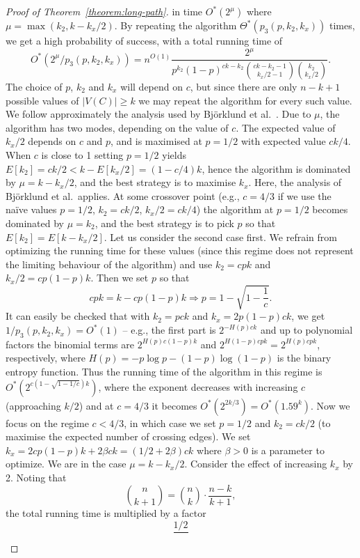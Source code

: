 \documentclass[10pt,a4paper]{article}
\begin{document}
\begin{proof}[Proof of Theorem~\ref{theorem:long-path}]
  in time $O^*(2^{\mu})$ where $\mu=\max(k_2,k-k_x/2)$.
  By repeating the algorithm $\Theta^*(p_3(p,k_2,k_x))$ times,
  we get a high probability of success, with a total running time of
  \[
    O^*(2^\mu/p_3(p, k_2, k_x)) = n^{O(1)}
    \frac{2^\mu}{p^{k_2}(1-p)^{ck-k_2}  \binom{ck-k_2-1}{k_x/2-1} \binom{k_2}{k_x/2}}.
  \]
  The choice of $p$, $k_2$ and $k_x$ will depend on $c$, but since
  there are only $n-k+1$ possible values of $|V(C)| \geq k$ we may
  repeat the algorithm for every such value. We follow approximately
  the analysis used by Bj\"orklund et al.~\cite{BjorklundHKK17narrow}.
  Due to $\mu$, the algorithm has two modes, depending on the value of $c$.
  The expected value of $k_x/2$ depends on $c$ and $p$, and is maximised
  at $p=1/2$ with expected value $ck/4$. When $c$ is close to 1 setting $p=1/2$
  yields $E[k_2]=ck/2 < k-E[k_x/2]=(1-c/4)k$, hence the algorithm is
  dominated by $\mu=k-k_x/2$, and the best strategy is to maximise $k_x$.
  Here, the analysis of Bj\"orklund et al.\ applies. At some crossover point
  (e.g., $c = 4/3$ if we use the na\"ive values $p=1/2$, $k_2=ck/2$,
  $k_x/2=ck/4$) the algorithm at $p=1/2$ becomes dominated by $\mu=k_2$,
  and the best strategy is to pick $p$ so that $E[k_2]=E[k-k_x/2]$.
  Let us consider the second case first. We refrain from optimizing
  the running time for these values (since this regime does not
  represent the limiting behaviour of the algorithm) and 
  use $k_2=cpk$ and $k_x/2=cp(1-p)k$. Then we set $p$ so that
  \[
    cpk = k-cp(1-p)k \Rightarrow p = 1-\sqrt{1-\frac{1}{c}}.
  \]
  It can easily be checked that with $k_2=pck$ and $k_x=2p(1-p)ck$,
  we get $1/p_3(p,k_2,k_x)=O^*(1)$ -- e.g., the first part is $2^{-H(p)ck}$
  and up to polynomial factors the binomial terms are $2^{H(p)c(1-p)k}$
  and $2^{H(1-p)cpk}=2^{H(p)cpk}$, respectively, where $H(p)=-p\log p-(1-p)\log (1-p)$ 
  is the binary entropy function. Thus the running time of the
  algorithm in this regime is $O^*(2^{c(1-\sqrt{1-1/c})k})$,
  where the exponent decreases with increasing $c$ (approaching $k/2$)
  and at $c=4/3$ it becomes $O^*(2^{2k/3})=O^*(1.59^k)$.
  Now we focus on the regime $c<4/3$, in which case we set $p=1/2$
  and $k_2=ck/2$ (to maximise the expected number of crossing edges).
  We set $k_x=2cp(1-p)k + 2\beta c k=(1/2 + 2\beta)ck$ where $\beta > 0$
  is a parameter to optimize. We are in the case $\mu = k-k_x/2$. Consider
  the effect of increasing $k_x$ by 2. Noting that
  \[
    \binom{n}{k+1} = \binom{n}{k} \cdot \frac{n-k}{k+1},
  \]
  the total running time is multiplied by a factor
  \[
    \frac{1/2}{
}\]
\end{proof}
\end{document}
